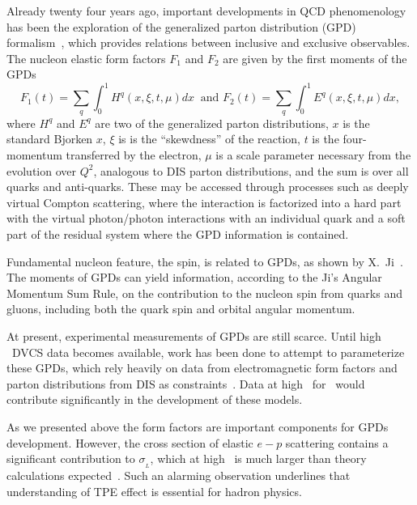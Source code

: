 Already twenty four years ago, important developments in QCD phenomenology has been the exploration of the generalized parton distribution (GPD) formalism~\cite{Mueller:1998fv, Ji:1996ek, Radyushkin:1996nd}, which provides relations between inclusive and exclusive observables.
The nucleon elastic form factors $F_1$ and $F_2$ are given by the first moments of the GPDs
%
\begin{equation}
F_1(t) = \sum_q \int^1_0 H^q (x,\xi,t,\mu) dx\ 
 \mbox{  and\  }
F_2(t) = \sum_q \int^1_0 E^q (x,\xi,t,\mu) dx,
\label{eq:F1/2}
\end{equation}
%
where $H^q$ and $E^q$ are two of the generalized parton distributions, $x$ is the standard Bjorken $x$, $\xi$ is is the ``skewdness'' of the reaction, $t$ is the four-momentum transferred by the electron, $\mu$ is a scale parameter necessary from the evolution over $Q^2$, analogous to DIS parton distributions, and the sum is over all quarks and anti-quarks.  
These may be accessed through processes such as deeply virtual Compton scattering, where the interaction is factorized into a hard part with the virtual photon/photon interactions with an individual quark and a soft part of the residual system where the GPD information is contained.

Fundamental nucleon feature, the spin, is related to GPDs, as shown by X.~Ji~\cite{Ji:1996ek}. 
The moments of GPDs can yield information, according to the Ji's Angular Momentum Sum Rule, 
on the contribution to the nucleon spin from quarks and gluons, including both the quark spin and orbital angular momentum.

At present, experimental measurements of GPDs are still scarce.  
Until high \qsq~DVCS data becomes available, work has been done to attempt to parameterize these GPDs,  
which rely heavily on data from electromagnetic form factors and parton distributions from DIS as constraints~\cite{Diehl:2013xca}.  
Data at high \qsq~for \gen~would contribute significantly in the development of these models.

As we presented above the form factors are important components for GPDs development.
However, the cross section of elastic $e-p$ scattering contains a significant contribution to $\sigma_{_L}$, 
which at high \qsq~is much larger than theory calculations expected~\cite{Kivel2020ab}.
Such an alarming observation underlines that understanding of TPE effect is essential for hadron physics. 
%
